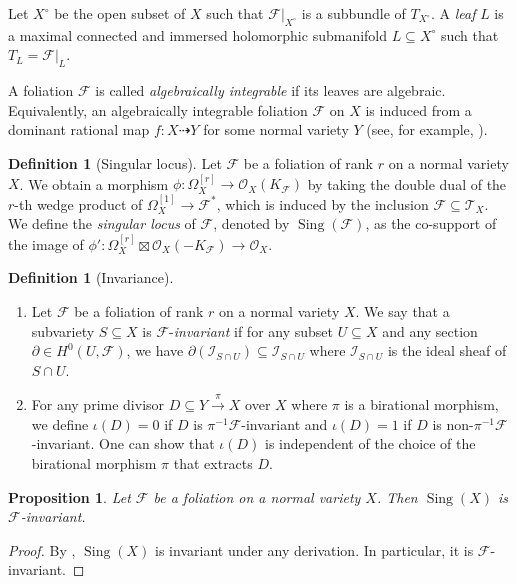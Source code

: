 \documentclass[12pt,reqno]{amsart}
\newtheorem{proposition}[theorem]{Proposition}
\theoremstyle{definition}
\newtheorem{definition}[theorem]{Definition}
\newcommand{\mc}{\mathcal}
\newcommand{\on}{\operatorname}
\newcommand\cF{{\mathcal{F}}}
\newcommand\cI{{\mathcal{I}}}
\newcommand\cO{{\mathcal{O}}}
\newcommand\cT{{\mathcal{T}}}
\begin{document}
Let $X^\circ$ be the open subset of $X$ such that $\cF\vert_{X^\circ}$ is a subbundle of $T_{X^\circ}$. 
A \emph{leaf} $L$ is a maximal connected and immersed holomorphic submanifold $L\subseteq X^\circ$ such that $T_L = \cF\vert_L$. 

A foliation $\cF$ is called \emph{algebraically integrable} if its leaves are algebraic. 
Equivalently, an algebraically integrable foliation $\cF$ on $X$ is induced from a dominant rational map $f\colon X\dashrightarrow Y$ for some normal variety $Y$ (see, for example, \cite[Sections 3.2 and 3.6]{druel2021foliation}).

\begin{definition}[Singular locus]
Let $\cF$ be a foliation of rank $r$ on a normal variety $X$. 
We obtain a morphism $\phi\colon \Omega_X^{[r]} \to \cO_X(K_\cF)$ by taking the double dual of the $r$-th wedge product of $\Omega_X^{[1]}\to \cF^*$, which is induced by the inclusion $\cF\subseteq \cT_X$. 
We define the \emph{singular locus} of $\cF$, denoted by $\on{Sing}(\cF)$, as the co-support of the image of $\phi'\colon \Omega_X^{[r]}\boxtimes\cO_X(-K_\cF) \to \cO_X$. 
\end{definition}

\begin{definition}[Invariance]\label{defn_invariance}\hspace{1em}
\begin{enumerate}
\item
    Let $\cF$ be a foliation of rank $r$ on a normal variety $X$. 
    We say that a subvariety $S\subseteq X$ is $\cF$-\emph{invariant} if for any subset $U\subseteq X$ and any section $\partial\in H^0(U,\cF)$, we have 
    $\partial(\cI_{S\cap U})\subseteq\cI_{S\cap U}$ 
    where $\cI_{S\cap U}$ is the ideal sheaf of $S\cap U$. 
\item
    For any prime divisor $D\subseteq Y \xrightarrow{\pi} X$ over $X$ where $\pi$ is a birational morphism, we define $\iota(D)=0$ if $D$ is $\pi^{-1}\cF$-invariant and $\iota(D)=1$ if $D$ is non-$\pi^{-1}\mc F$-invariant. One can show that $\iota(D)$ is independent of the choice of the birational morphism $\pi$ that extracts $D$.
\end{enumerate}
\end{definition}

\begin{proposition}\label{sing_X_inv_prop}
    Let $\mc F$ be a foliation on a normal variety $X$. 
    Then $\on{Sing}(X)$ is $\cF$-invariant.
\end{proposition}
\begin{proof}
    By \cite[Theorem 5]{seidenberg67differential}, $\on{Sing}(X)$ is invariant under any derivation. 
    In particular, it is $\cF$-invariant. 
\end{proof}
\end{document}
